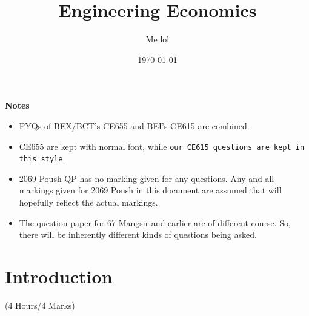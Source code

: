 \documentclass[12pt]{article}
\title{Engineering Economics}
\author{Me lol}
\date{\today}
\begin{document}
\maketitle
\vspace{10cm}
\begin{large}\textbf{Notes}\end{large}
\begin{itemize}
\item PYQs of BEX/BCT's CE655 and BEI's CE615 are combined.
\item CE655 are kept with normal font, while \texttt{our CE615 questions are kept in this style}.
\item 2069 Poush QP has no marking given for any questions. Any and all markings given for 2069 Poush in this document are assumed that will hopefully reflect the actual markings.
\item The question paper for 67 Mangsir and earlier are of different course. So, there will be inherently different kinds of questions being asked.
\end{itemize}
\pagebreak
\tableofcontents
\pagebreak

\section{Introduction}
	\begin{center}(4 Hours/4 Marks)\end{center}
\end{document}
